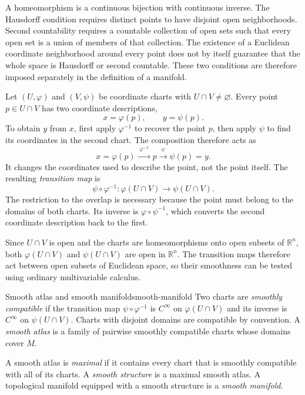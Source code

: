 \documentclass[11pt,a4paper]{article}
\numberwithin{equation}{section}
\newcommand{\R}{\mathbb R}
\begin{document}
A homeomorphism is a continuous bijection with continuous inverse. The
Hausdorff condition requires distinct points to have disjoint open
neighborhoods. Second countability requires a countable collection of
open sets such that every open set is a union of members of that collection.
The existence of a Euclidean coordinate neighborhood around
every point does not by itself guarantee that the whole space is
Hausdorff or second countable. These two conditions are therefore
imposed separately in the definition of a manifold.

Let \((U,\varphi)\) and \((V,\psi)\) be coordinate charts with
\(U\cap V\neq\varnothing\). Every point \(p\in U\cap V\) has two
coordinate descriptions,
\[
 x=\varphi(p),
 \qquad
 y=\psi(p).
\]
To obtain \(y\) from \(x\), first apply \(\varphi^{-1}\) to recover
the point \(p\), then apply \(\psi\) to find its coordinates in the
second chart. The composition therefore acts as
\[
 x=\varphi(p)
 \xrightarrow{\;\varphi^{-1}\;}
 p
 \xrightarrow{\;\psi\;}
 \psi(p)=y.
\]
It changes the coordinates used to describe the point, not the point
itself. The resulting \emph{transition map} is
\[
 \psi\circ\varphi^{-1}:
 \varphi(U\cap V)\longrightarrow\psi(U\cap V).
\]
The restriction to the overlap is necessary because the point must
belong to the domains of both charts. Its inverse is
\(\varphi\circ\psi^{-1}\), which converts the second coordinate
description back to the first.

Since \(U\cap V\) is open and the charts are homeomorphisms onto open
subsets of \(\R^n\), both \(\varphi(U\cap V)\) and \(\psi(U\cap V)\)
are open in \(\R^n\). The transition maps therefore act between open
subsets of Euclidean space, so their smoothness can be tested using
ordinary multivariable calculus.

\begin{definition}{Smooth atlas and smooth manifold}{smooth-manifold}
Two charts are \emph{smoothly compatible} if the transition map
\(\psi\circ\varphi^{-1}\) is \(C^\infty\) on \(\varphi(U\cap V)\)
and its inverse is \(C^\infty\) on \(\psi(U\cap V)\).
Charts with disjoint domains are compatible by convention.
A \emph{smooth atlas} is a family of pairwise smoothly compatible
charts whose domains cover \(M\).

A smooth atlas is \emph{maximal} if it contains every chart that is
smoothly compatible with all of its charts. A \emph{smooth structure}
is a maximal smooth atlas. A topological manifold equipped with
a smooth structure is a \emph{smooth manifold}.
\end{definition}
\end{document}
